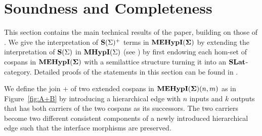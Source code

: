 \section{Soundness and Completeness}\label{sec:soundness-and-completeness}

This section contains the main technical results of the paper,  building on those of \cite{bonchi_string_2022-2}.
We give the interpretation of $\mathbf{S}(\Sigma)^{+}$ terms in ${\mathbf{MEHypI(\Sigma)}}$ by extending the interpretation of $\mathbf{S}(\Sigma)$ in $\textbf{MHypI}(\Sigma)$ (see ) by first endowing each hom-set of cospans in ${\mathbf{MEHypI(\Sigma)}}$ with a semilattice structure turning it into an $\mathbf{SLat}$-category.
Detailed proofs of the statements in this section can be found in .


\begin{definition}
We define the join $+$ of two extended cospans in ${\mathbf{MEHypI(\Sigma)}}(n,m)$ as in Figure~\ref{fig:A+B}
by introducing a hierarchical edge with $n$ inputs and $k$ outputs that has both carriers of the two cospans as its successors.
The two carriers become two different consistent components of a newly introduced hierarchical edge such that the interface morphisms are preserved.

\end{definition}

